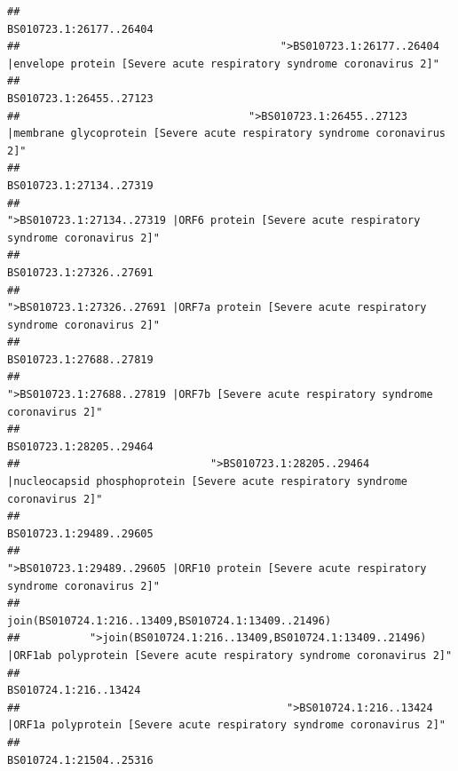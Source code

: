 \documentclass[
]{article}
\begin{document}
\begin{verbatim}
##                                                                                                                BS010723.1:26177..26404 
##                                         ">BS010723.1:26177..26404 |envelope protein [Severe acute respiratory syndrome coronavirus 2]" 
##                                                                                                                BS010723.1:26455..27123 
##                                    ">BS010723.1:26455..27123 |membrane glycoprotein [Severe acute respiratory syndrome coronavirus 2]" 
##                                                                                                                BS010723.1:27134..27319 
##                                             ">BS010723.1:27134..27319 |ORF6 protein [Severe acute respiratory syndrome coronavirus 2]" 
##                                                                                                                BS010723.1:27326..27691 
##                                            ">BS010723.1:27326..27691 |ORF7a protein [Severe acute respiratory syndrome coronavirus 2]" 
##                                                                                                                BS010723.1:27688..27819 
##                                                    ">BS010723.1:27688..27819 |ORF7b [Severe acute respiratory syndrome coronavirus 2]" 
##                                                                                                                BS010723.1:28205..29464 
##                              ">BS010723.1:28205..29464 |nucleocapsid phosphoprotein [Severe acute respiratory syndrome coronavirus 2]" 
##                                                                                                                BS010723.1:29489..29605 
##                                            ">BS010723.1:29489..29605 |ORF10 protein [Severe acute respiratory syndrome coronavirus 2]" 
##                                                                                    join(BS010724.1:216..13409,BS010724.1:13409..21496) 
##           ">join(BS010724.1:216..13409,BS010724.1:13409..21496) |ORF1ab polyprotein [Severe acute respiratory syndrome coronavirus 2]" 
##                                                                                                                  BS010724.1:216..13424 
##                                          ">BS010724.1:216..13424 |ORF1a polyprotein [Severe acute respiratory syndrome coronavirus 2]" 
##                                                                                                                BS010724.1:21504..25316 

\end{verbatim}
\end{document}
